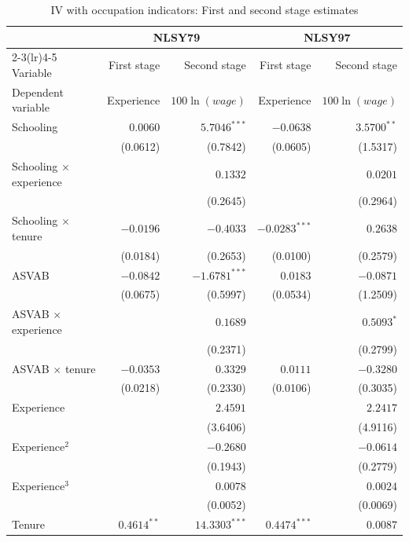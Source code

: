 \documentclass[11pt]{article}
\begin{document}
\clearpage
\begin{table}[p]\centering
\caption{IV with occupation indicators: First and second stage estimates}\label{tab:occupation_iv_combined}
\begin{threeparttable}
\renewcommand{\baselinestretch}{1}\fontsize{9}{9.5}\selectfont
\setlength{\tabcolsep}{3pt}\renewcommand{\arraystretch}{1}
\begin{tabular*}{\textwidth}{@{\extracolsep{\fill}}p{}rrrr@{}}
\toprule
& \multicolumn{2}{c}{NLSY79} & \multicolumn{2}{c}{NLSY97} \\
\cmidrule(lr){2-3}\cmidrule(lr){4-5}
Variable & First stage & Second stage & First stage & Second stage \\
Dependent variable & Experience & $100\ln(wage)$ & Experience & $100\ln(wage)$ \\
\midrule
Schooling & $0.0060$ & $5.7046^{***}$ & $-0.0638$ & $3.5700^{**}$ \\
 & (0.0612) & (0.7842) & (0.0605) & (1.5317) \\
Schooling $\times$ experience &  & $0.1332$ &  & $0.0201$ \\
 &  & (0.2645) &  & (0.2964) \\
Schooling $\times$ tenure & $-0.0196$ & $-0.4033$ & $-0.0283^{***}$ & $0.2638$ \\
 & (0.0184) & (0.2653) & (0.0100) & (0.2579) \\
ASVAB & $-0.0842$ & $-1.6781^{***}$ & $0.0183$ & $-0.0871$ \\
 & (0.0675) & (0.5997) & (0.0534) & (1.2509) \\
ASVAB $\times$ experience &  & $0.1689$ &  & $0.5093^{*}$ \\
 &  & (0.2371) &  & (0.2799) \\
ASVAB $\times$ tenure & $-0.0353$ & $0.3329$ & $0.0111$ & $-0.3280$ \\
 & (0.0218) & (0.2330) & (0.0106) & (0.3035) \\
Experience &  & $2.4591$ &  & $2.2417$ \\
 &  & (3.6406) &  & (4.9116) \\
Experience$^2$ &  & $-0.2680$ &  & $-0.0614$ \\
 &  & (0.1943) &  & (0.2779) \\
Experience$^3$ &  & $0.0078$ &  & $0.0024$ \\
 &  & (0.0052) &  & (0.0069) \\
Tenure & $0.4614^{**}$ & $14.3303^{***}$ & $0.4474^{***}$ & $0.0087$ \\

\end{tabular*}
\end{threeparttable}
\end{table}
\end{document}

